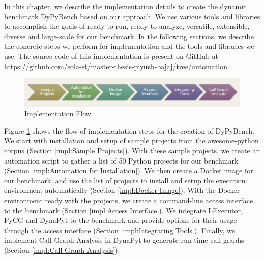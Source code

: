 In this chapter, we describe the implementation details to create the dynamic benchmark DyPyBench based on our approach.
We use various tools and libraries to accomplish the goals of ready-to-run, ready-to-analyze, versatile, extensible, diverse and large-scale for our benchmark.
In the following sections, we describe the concrete steps we perform for implementation and the tools and libraries we use.
The source code of this implementation is present on GitHub at \url{https://github.com/sola-st/master-thesis-piyush-bajaj/tree/automation}.

\begin{figure}[ht]
    \centering
    \includegraphics[width=1\linewidth]{figures/implementation/implementaion_flow.png}
    \caption{Implementation Flow}
    \label{fig:implementation_flow}
\end{figure}

Figure \ref{fig:implementation_flow} shows the flow of implementation steps for the creation of DyPyBench. 
We start with installation and setup of sample projects from the awesome-python corpus (Section \ref{impl:Sample Projects}).
With these sample projects, we create an automation script to gather a list of 50 Python projects for our benchmark (Section \ref{impl:Automation for Installation}).
We then create a Docker image for our benchmark, and use the list of projects to install and setup the execution environment automatically (Section \ref{impl:Docker Image}).
With the Docker environment ready with the projects, we create a command-line access interface to the benchmark (Section \ref{impl:Access Interface}).   
We integrate LExecutor, PyCG and DynaPyt to the benchmark and provide options for their usage through the access interface (Section \ref{impl:Integrating Tools}).
Finally, we implement Call Graph Analysis in DynaPyt to generate run-time call graphs (Section \ref{impl:Call Graph Analysis}).


